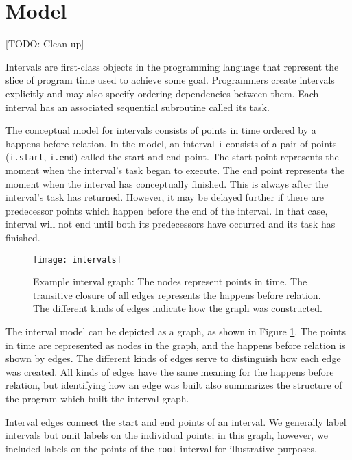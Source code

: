 \section{Model}
\label{sec:intervals-model}

[TODO: Clean up]

Intervals are first-class objects in the programming language that
represent the slice of program time used to achieve some
goal. Programmers create intervals explicitly and may also specify
ordering dependencies between them. Each interval has an associated
sequential subroutine called its task.

The conceptual model for intervals consists of points in time ordered
by a happens before relation. In the model, an interval \lstinline|i|
consists of a pair of points (\lstinline|i.start|, \lstinline|i.end|)
called the start and end point. The start point represents the moment
when the interval's task began to execute. The end point represents
the moment when the interval has conceptually finished. This is always
after the interval's task has returned. However, it may be delayed
further if there are predecessor points which happen before the end of
the interval. In that case, interval will not end until both its
predecessors have occurred and its task has finished.

\begin{figure}[htb]
  \centering
  \texttt{[image: intervals]}
  \caption[Example interval graph]{Example interval graph: The nodes
    represent points in time. The transitive closure of all edges
    represents the happens before relation. The different kinds of
    edges indicate how the graph was constructed.}
  \label{fig:intervals}
\end{figure}

The interval model can be depicted as a graph, as shown in Figure
\ref{fig:intervals}. The points in time are represented as nodes in
the graph, and the happens before relation is shown by edges. The
different kinds of edges serve to distinguish how each edge was
created. All kinds of edges have the same meaning for the happens
before relation, but identifying how an edge was built also summarizes
the structure of the program which built the interval graph.

Interval edges connect the start and end points of an interval. We
generally label intervals but omit labels on the individual points; in
this graph, however, we included labels on the points of the
\lstinline|root| interval for illustrative purposes.

